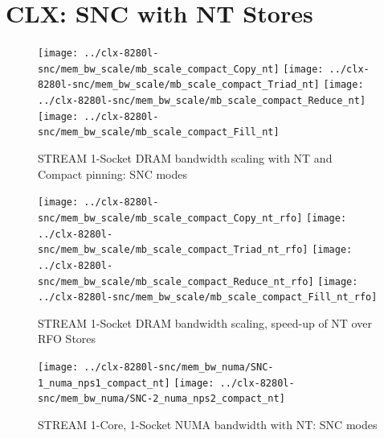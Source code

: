 \documentclass{article}
\begin{document}
\section{CLX: SNC with NT Stores}
\begin{figure}[!ht]
    \centering
    \texttt{[image: ../clx-8280l-snc/mem\_bw\_scale/mb\_scale\_compact\_Copy\_nt]}
    \texttt{[image: ../clx-8280l-snc/mem\_bw\_scale/mb\_scale\_compact\_Triad\_nt]}
    \texttt{[image: ../clx-8280l-snc/mem\_bw\_scale/mb\_scale\_compact\_Reduce\_nt]}
    \texttt{[image: ../clx-8280l-snc/mem\_bw\_scale/mb\_scale\_compact\_Fill\_nt]}
    \caption{STREAM 1-Socket DRAM bandwidth scaling with NT and Compact pinning: SNC modes}
    \label{figure:mem_bw_scale_compact_NT_clx_snc}
\end{figure}
\begin{figure}[!ht]
    \centering
    \texttt{[image: ../clx-8280l-snc/mem\_bw\_scale/mb\_scale\_compact\_Copy\_nt\_rfo]}
    \texttt{[image: ../clx-8280l-snc/mem\_bw\_scale/mb\_scale\_compact\_Triad\_nt\_rfo]}
    \texttt{[image: ../clx-8280l-snc/mem\_bw\_scale/mb\_scale\_compact\_Reduce\_nt\_rfo]}
    \texttt{[image: ../clx-8280l-snc/mem\_bw\_scale/mb\_scale\_compact\_Fill\_nt\_rfo]}
    \caption{STREAM 1-Socket DRAM bandwidth scaling, speed-up of NT over RFO Stores}
    \label{figure:mem_bw_scale_compact_nt_rfo_clx_snc}
\end{figure}

\begin{figure}[!ht]
    \centering
    \texttt{[image: ../clx-8280l-snc/mem\_bw\_numa/SNC-1\_numa\_nps1\_compact\_nt]}
    \texttt{[image: ../clx-8280l-snc/mem\_bw\_numa/SNC-2\_numa\_nps2\_compact\_nt]}
    \caption{STREAM 1-Core, 1-Socket NUMA bandwidth with NT: SNC modes}
    \label{figure:mem_bw_numa_nt_clx_snc}
\end{figure}
\end{document}
